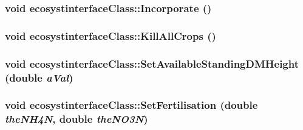 \label{classecosystinterface_class_a6f6d16c5273187cdb9fd2da5dfc7237f}
\hypertarget{classecosystinterface_class_a16d2e00bff76a098b1b64601d900647c}{
\subsubsection[{Incorporate}]{\setlength{\rightskip}{0pt plus 5cm}void ecosystinterfaceClass::Incorporate ()}}
\label{classecosystinterface_class_a16d2e00bff76a098b1b64601d900647c}
\hypertarget{classecosystinterface_class_a189a315993f809e6f9b766f67600c898}{
\subsubsection[{KillAllCrops}]{\setlength{\rightskip}{0pt plus 5cm}void ecosystinterfaceClass::KillAllCrops ()}}
\label{classecosystinterface_class_a189a315993f809e6f9b766f67600c898}
\hypertarget{classecosystinterface_class_a9c73e61b3abb64416ef8f40c8bd023a8}{
\subsubsection[{SetAvailableStandingDMHeight}]{\setlength{\rightskip}{0pt plus 5cm}void ecosystinterfaceClass::SetAvailableStandingDMHeight (double {\em aVal})}}
\label{classecosystinterface_class_a9c73e61b3abb64416ef8f40c8bd023a8}
\hypertarget{classecosystinterface_class_a5a1165ff5e89c95550b70b8406ac893f}{
\subsubsection[{SetFertilisation}]{\setlength{\rightskip}{0pt plus 5cm}void ecosystinterfaceClass::SetFertilisation (double {\em theNH4N}, \/  double {\em theNO3N})}}
